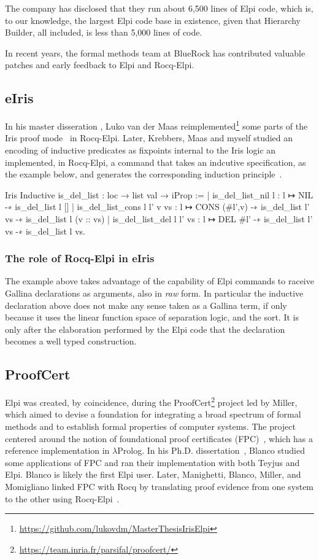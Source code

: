 \documentclass[a4paper, 11pt]{book}
\begin{document}
The company has disclosed that they run about 6,500 lines of Elpi code, which
is, to our knowledge, the largest Elpi code base in existence, given that
Hierarchy Builder, all included, is less than 5,000 lines of code.

In recent years, the formal methods team at BlueRock has contributed valuable
patches and early feedback to Elpi and Rocq-Elpi.

\subsection{eIris}

In his master disseration \cite{Maas2024}, Luko van der Maas reimplemented\footnote{\url{https://github.com/lukovdm/MasterThesisIrisElpi}}
some parts of the Iris proof mode~\cite{10.1007/978-3-662-54434-1_26} in
Rocq-Elpi. Later, Krebbers, Maas and myself studied an encoding of inductive
predicates as fixpoints internal to the Iris logic an implemented,
in Rocq-Elpi, a command that takes an indcutive specification, as the example
below, and generates the corresponding induction principle~\cite{TODO}.

\begin{rocqcode}
Iris Inductive is_del_list : loc → list val → iProp :=
| is_del_list_nil l : l ↦ NIL -∗ is_del_list l []
| is_del_list_cons l l' v vs :
    l ↦ CONS (#l',v) -∗ is_del_list l' vs -∗ is_del_list l (v :: vs)
| is_del_list_del l l' vs :
    l ↦ DEL #l' -∗ is_del_list l' vs -∗ is_del_list l vs.
\end{rocqcode}

\subsubsection{The role of Rocq-Elpi in eIris}
The example above takes advantage of the capability of Elpi commands to
raceive Gallina declarations as arguments, also in \emph{raw} form.
In particular the inductive declaration above does not make any sense
taken as a Gallina term, if only because it uses the linear function
space of separation logic, and the  sort.
It is only after the elaboration performed by
the Elpi code that the declaration becomes a well typed construction.

\subsection{ProofCert}

Elpi was created, by coincidence, during the
ProofCert\footnote{\url{https://team.inria.fr/parsifal/proofcert/}}
project led by Miller, which aimed to devise a foundation for integrating a
broad spectrum of formal methods and to establish formal properties of computer
systems. The project centered around the notion of foundational proof
certificates (FPC)~\cite{Marek_2016}, which has a reference implementation in
$\lambda$Prolog. In his Ph.D. dissertation~\cite{rob}, Blanco studied some
applications of FPC and ran their implementation with both Teyjus and Elpi.
Blanco is likely the first Elpi user. Later, Manighetti, Blanco, Miller, and
Momigliano linked FPC with Rocq by translating proof evidence from one system
to the other using Rocq-Elpi~\cite{matteo,alberto}.
\end{document}
